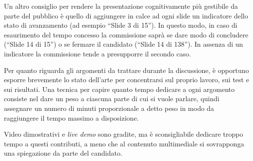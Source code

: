 \documentclass[12pt]{report}
\begin{document}
    Un altro consiglio per rendere la presentazione cognitivamente più gestibile da parte del pubblico è quello di aggiungere in calce ad ogni slide un indicatore dello stato di avanzamento (ad esempio ``Slide 3 di 15''). In questo modo, in caso di esaurimento del tempo concesso la commissione saprà se dare modo di concludere (``Slide 14 di 15'') o se fermare il candidato (``Slide 14 di 138''). In assenza di un indicatore la commissione tende a presupporre il secondo caso.

    Per quanto riguarda gli argomenti da trattare durante la discussione, è opportuno esporre brevemente lo stato dell'arte per concentrarsi sul proprio lavoro, sui test e sui risultati. Una tecnica per capire quanto tempo dedicare a ogni argomento consiste nel dare un peso a ciascuna parte di cui si vuole parlare, quindi assegnare un numero di minuti proporzionale a detto peso in modo da raggiungere il tempo massimo a disposizione.

    Video dimostrativi e \textit{live demo} sono gradite, ma è sconsigliabile dedicare troppo tempo a questi contributi, a meno che al contenuto multimediale si sovrapponga una spiegazione da parte del candidato.


%
%

    \beforebibliography
    
    

    \closingpage
\end{document}
